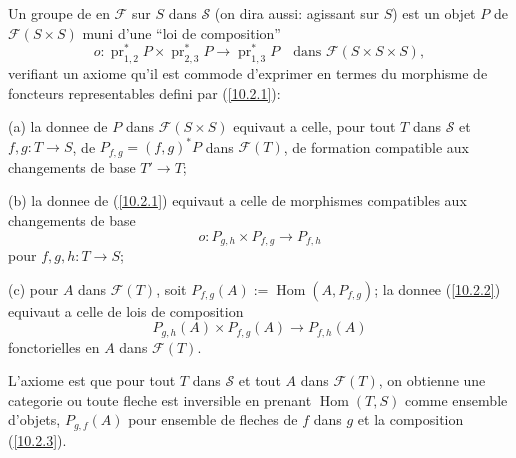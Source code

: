 \documentclass[12pt,a4paper]{article}
\theoremstyle{plain}
\theoremstyle{definition}
\theoremstyle{remark}
\DeclareMathOperator{\Hom}{Hom}
\DeclareMathOperator{\pr}{pr}
\begin{document}
Un groupe de en $\mathcal{F}$ sur $S$ dans $\mathcal{S}$ (on dira aussi: agissant sur $S$) est un objet $P$ de $\mathcal{F}(S \times S)$ muni d'une ``loi de composition''
\begin{equation}\label{10.2.1}
o: \pr_{1,2}^* P \times \pr_{2,3}^* P \longrightarrow \pr_{1,3}^* P \quad \text{dans } \mathcal{F}(S \times S \times S), \tag{10.2.1}
\end{equation}
verifiant un axiome qu'il est commode d'exprimer en termes du morphisme de foncteurs representables defini par (\ref{10.2.1}):

(a) la donnee de $P$ dans $\mathcal{F}(S \times S)$ equivaut a celle, pour tout $T$ dans $\mathcal{S}$ et $f, g: T \to S$, de $P_{f,g} = (f,g)^* P$ dans $\mathcal{F}(T)$, de formation compatible aux changements de base $T' \to T$;

(b) la donnee de (\ref{10.2.1}) equivaut a celle de morphismes compatibles aux changements de base
\begin{equation}\label{10.2.2}
o: P_{g,h} \times P_{f,g} \longrightarrow P_{f,h} \tag{10.2.2}
\end{equation}
pour $f, g, h: T \to S$;

(c) pour $A$ dans $\mathcal{F}(T)$, soit $P_{f,g}(A) := \Hom(A, P_{f,g})$; la donnee (\ref{10.2.2}) equivaut a celle de lois de composition
\begin{equation}\label{10.2.3}
P_{g,h}(A) \times P_{f,g}(A) \longrightarrow P_{f,h}(A) \tag{10.2.3}
\end{equation}
fonctorielles en $A$ dans $\mathcal{F}(T)$.

L'axiome est que pour tout $T$ dans $\mathcal{S}$ et tout $A$ dans $\mathcal{F}(T)$, on obtienne une categorie ou toute fleche est inversible en prenant $\Hom(T, S)$ comme ensemble d'objets, $P_{g,f}(A)$ pour ensemble de fleches de $f$ dans $g$ et la composition (\ref{10.2.3}).
\end{document}
